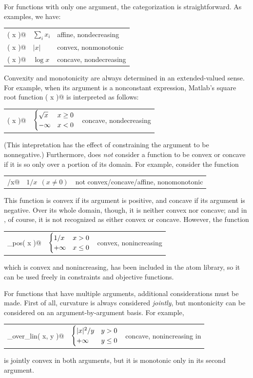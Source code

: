 \documentclass[12pt]{article}
\begin{document}
For functions with only one argument, the categorization is 
straightforward.  As examples, we have:
\begin{center}
\begin{tabular}{lll}
	\verb@sum( x )@ & $\sum_i x_i$ & affine, nondecreasing \\
	\verb@abs( x )@ & $|x|$ & convex, nonmonotonic \\
	\verb@log( x )@ & $\log x$ & concave, nondecreasing
\end{tabular}
\end{center}
Convexity and monotonicity are always determined in an 
extended-valued sense.
For example, when its argument is a nonconstant
\cvx expression, Matlab's square root function \verb@sqrt( x )@ is
interpreted as follows:
\begin{center}
\begin{tabular}{lll}
	\verb@sqrt( x )@ & $\begin{cases} \sqrt{x}&x\geq 0\\-\infty&x<0 \end{cases}$ & concave, nondecreasing \\
\end{tabular}
\end{center}
(This intepretation has the effect of constraining the argument \verb@x@
to be nonnegative.) Furthermore, \cvx does \emph{not} consider a function to be
convex or concave if it is so only over a portion of its domain. 
For example, consider the function
\begin{center}
\begin{tabular}{lll}
	\verb@1/x@ & $1/x~~(x\neq 0)$ & not convex/concave/affine, nonomonotonic
\end{tabular}
\end{center}
This function is convex if its argument is positive, and
concave if its argument is negative.  Over its whole domain, though,
it is neither convex nor concave;
and in \cvx, of course, it is not recognized as either convex or 
concave.
However, the function
\begin{center}
\begin{tabular}{lll}
	\verb@inv_pos( x )@ & $\begin{cases} 1/x &x>0\\+\infty&x\leq 0 \end{cases}$ & convex, nonincreasing
\end{tabular}
\end{center}
which is convex and nonincreasing,
has been included in the atom library,
so it can be used freely in constraints
and objective functions.

For functions that have multiple arguments, additional considerations must
be made. First of all, curvature is always considered \emph{jointly}, but montonicity
can be considered on an argument-by-argument basis. For example,
\begin{center}
\begin{tabular}{lll}
	\verb@quad_over_lin( x, y )@ & $\begin{cases} |x|^2/y&y> 0\\+\infty&y\leq 0 \end{cases}$ & concave, nonincreasing in \verb@y@
\end{tabular}
\end{center}
is jointly convex in both arguments, but it is monotonic 
only in its second argument.
\end{document}
